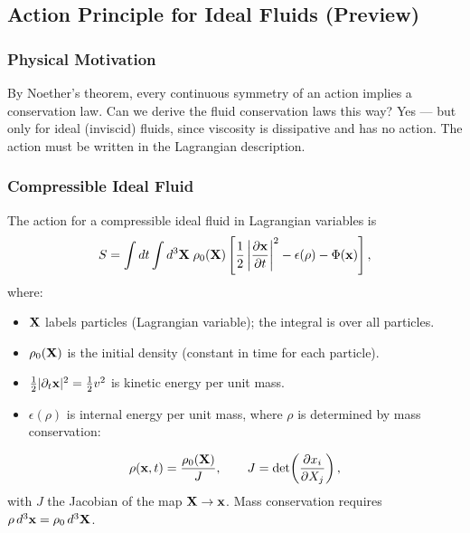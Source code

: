 \documentclass[../main.tex]{subfiles}
\begin{document}
\subsection{Action Principle for Ideal Fluids (Preview)}\label{sec:lec14:action}

\subsubsection*{Physical Motivation}
By Noether's theorem, every continuous symmetry of an action implies a conservation law. Can we derive the fluid conservation laws this way? Yes — but only for ideal (inviscid) fluids, since viscosity is dissipative and has no action. The action must be written in the Lagrangian description.

\subsubsection{Compressible Ideal Fluid}

The action for a compressible ideal fluid in Lagrangian variables is
\begin{equation}
  S = \int dt \int d^3\mathbf{X}\;\rho_0(\mathbf{X})
      \left[\frac{1}{2}\left|\pdv{\mathbf{x}}{t}\right|^2 - \epsilon(\rho) - \Phi(\mathbf{x})\right],
  \label{eq:lec14_action_comp}
\end{equation}
where:
\begin{itemize}
  \item $\mathbf{X}$ labels particles (Lagrangian variable); the integral is over all particles.
  \item $\rho_0(\mathbf{X})$ is the initial density (constant in time for each particle).
  \item $\tfrac{1}{2}|\partial_t\mathbf{x}|^2 = \tfrac{1}{2}v^2$ is kinetic energy per unit mass.
  \item $\epsilon(\rho)$ is internal energy per unit mass, where $\rho$ is determined by mass conservation:
\end{itemize}
\begin{equation}
  \rho(\mathbf{x},t) = \frac{\rho_0(\mathbf{X})}{J}, \qquad J = \det\!\left(\pdv{x_i}{X_j}\right),
  \label{eq:lec14_jacobian}
\end{equation}
with $J$ the Jacobian of the map $\mathbf{X}\to\mathbf{x}$. Mass conservation requires $\rho\,d^3\mathbf{x} = \rho_0\,d^3\mathbf{X}$.
\end{document}
